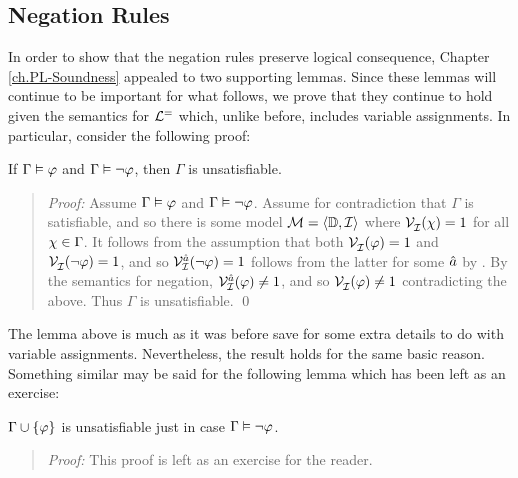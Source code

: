 \subsection{Negation Rules}%
  \label{sub:NegationRules}

In order to show that the negation rules preserve logical consequence, Chapter \ref{ch.PL-Soundness} appealed to two supporting lemmas.
Since these lemmas will continue to be important for what follows, we prove that they continue to hold given the semantics for $\mathcal{L}^{=}$ which, unlike before, includes variable assignments.
In particular, consider the following proof:
  
\begin{Lthm} \label{lemma:unsat}
  If $\Gamma \vDash \varphi$ and $\Gamma \vDash \neg\varphi$, then $\Gamma$ is unsatisfiable.
\end{Lthm}

\begin{quote} 
  \textit{Proof:} Assume $\Gamma \vDash \varphi$ and $\Gamma \vDash \neg\varphi$.
  Assume for contradiction that $\Gamma$ is satisfiable, and so there is some model $\mathcal{M} = \langle\mathbb{D}, \mathcal{I}\rangle$ where $\mathcal{V}_{\mathcal{I}}^{}(\chi) = 1$ for all $\chi \in \Gamma$. 
  It follows from the assumption that both $\mathcal{V}_{\mathcal{I}}^{}(\varphi) = 1$ and $\mathcal{V}_{\mathcal{I}}^{}(\neg \varphi) = 1$, and so $\mathcal{V}_{\mathcal{I}}^{\hat{a}}(\neg\varphi)=1$ follows from the latter for some $\hat{a}$ by .
  By the semantics for negation, $\mathcal{V}_{\mathcal{I}}^{\hat{a}}(\varphi)\neq 1$, and so $\mathcal{V}_{\mathcal{I}}^{}(\varphi) \neq 1$ contradicting the above.
  Thus $\Gamma$ is unsatisfiable. 
  \qed
\end{quote}



The lemma above is much as it was before save for some extra details to do with variable assignments.
Nevertheless, the result holds for the same basic reason.
Something similar may be said for the following lemma which has been left as an exercise:


\begin{Lthm} \label{lemma:unsatent}
  $\Gamma \cup \lbrace\varphi\rbrace$ is unsatisfiable just in case $\Gamma \vDash \neg\varphi$.
\end{Lthm}

\begin{quote} 
  \textit{Proof:}
  This proof is left as an exercise for the reader.
\end{quote}

